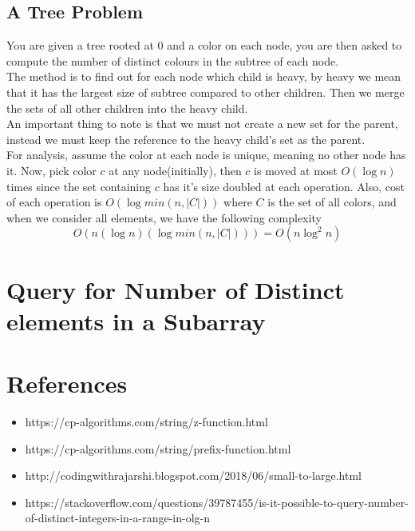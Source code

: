 \documentclass{article}
\begin{document}
    \subsection{A Tree Problem}

    You are given a tree rooted at $0$ and a color on each node, you
    are then asked to compute the number of distinct colours in the
    subtree of each node. \\
    The method is to find out for each node which child is heavy,
    by heavy we mean that it has the largest size of subtree compared to
    other children. Then we merge the sets of all other children into
    the heavy child. \\
    An important thing to note is that we must not create a new set for the
    parent, instead we must keep the reference to the heavy child's set
    as the parent. \\
    For analysis, assume the color at each node is unique, meaning no other
    node has it. Now, pick color $c$ at any node(initially), then $c$ is moved
    at most $O(\log n)$ times since the set containing $c$ has it's size
    doubled at each operation. Also, cost of each operation is
    $O(\log {min(n, |C|)})$ where $C$ is the set of all colors, and when
    we consider all elements, we have the following complexity
    \[
        O(n (\log n) (\log{min(n, |C|)})) = O(n \log^2n)
    \]

    \section{Query for Number of Distinct elements in a Subarray}

    \section{References}

    \begin{itemize}
        \item https://cp-algorithms.com/string/z-function.html
        \item https://cp-algorithms.com/string/prefix-function.html
        \item http://codingwithrajarshi.blogspot.com/2018/06/small-to-large.html
        \item https://stackoverflow.com/questions/39787455/is-it-possible-to-query-number-of-distinct-integers-in-a-range-in-olg-n
    \end{itemize}
\end{document}
